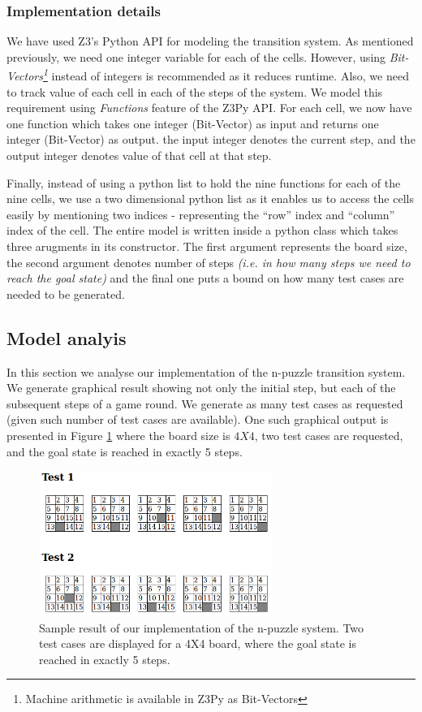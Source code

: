 \documentclass{sig-alternate-05-2015}
\begin{document}
\subsubsection{Implementation details}

We have used Z3's Python API for modeling the transition system. As mentioned previously, we need one 
integer variable for each of the cells. However, using \textit{Bit-Vectors\footnote{Machine arithmetic 
is available in Z3Py as Bit-Vectors}} instead of integers is recommended as it reduces runtime. Also, 
we need to track value of each cell in each of the steps of the system. We model this requirement using 
\textit{Functions} feature of the Z3Py API. For each cell, we now have one function which takes one 
integer (Bit-Vector) as input and returns one integer (Bit-Vector) as output. the input integer denotes 
the current step, and the output integer denotes value of that cell at that step.

Finally, instead of using a python list to hold the nine functions for each of the nine cells, we use
a two dimensional python list as it enables us to access the cells easily by mentioning two 
indices - representing the ``row'' index and ``column'' index of the cell. The entire model 
is written inside a python class which takes three arugments in its constructor. The first 
argument represents the board size, the second argument denotes number of steps \textit{ (i.e. 
in how many steps we need to reach the goal state)} and the final one puts a bound on how 
many test cases are needed to be generated.


\subsection{Model analyis}

In this section we analyse our implementation of the n-puzzle transition system. We generate 
graphical result showing not only the initial step, but each of the subsequent 
steps of a game round. We generate as many test cases as requested (given such number of test 
cases are available). One such graphical output is presented in Figure \ref{fig:npdemo} where 
the board size is $4 X 4$, two test cases are requested, and the goal state is reached 
in exactly 5 steps.

\begin{figure}
\centering
\includegraphics[width=3in]{npdemo}
\caption{Sample result of our implementation of the n-puzzle system. Two test cases
are displayed for a 4X4 board, where the goal state is reached in exactly 5 steps.}
\label{fig:npdemo}
\end{figure}
\end{document}

